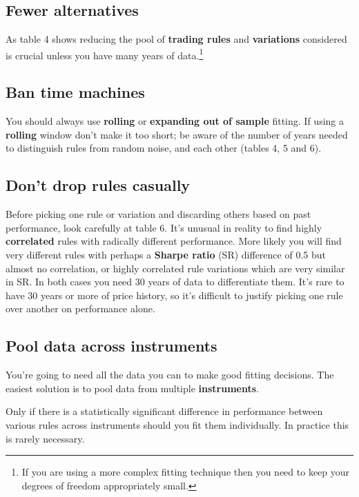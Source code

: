 \subsection*{Fewer alternatives}

As table 4 shows reducing the pool of \textbf{trading rules} and \textbf{variations} considered is crucial unless you have many years of data.\footnote{If you are using a more complex fitting technique then you need to keep your degrees of freedom appropriately small.}

\subsection*{Ban time machines}

You should always use \textbf{rolling} or \textbf{expanding out of sample} fitting. If using a \textbf{rolling} window don't make it too short; be aware of the number of years needed to distinguish rules from random noise, and each other (tables 4, 5 and 6).

\subsection*{Don't drop rules casually}

Before picking one rule or variation and discarding others based on past performance, look carefully at table 6. It's unusual in reality to find highly \textbf{correlated} rules with radically different performance. More likely you will find very different rules with perhaps a \textbf{Sharpe ratio} (SR) difference of 0.5 but almost no correlation, or highly correlated rule variations which are very similar in SR. In both cases you need 30 years of data to differentiate them. It's rare to have 30 years or more of price history, so it's difficult to justify picking one rule over another on performance alone.

\subsection*{Pool data across instruments}

You're going to need all the data you can to make good fitting decisions. The easiest solution is to pool data from multiple \textbf{instruments}.

Only if there is a statistically significant difference in performance between various rules across instruments should you fit them individually. In practice this is rarely necessary.


